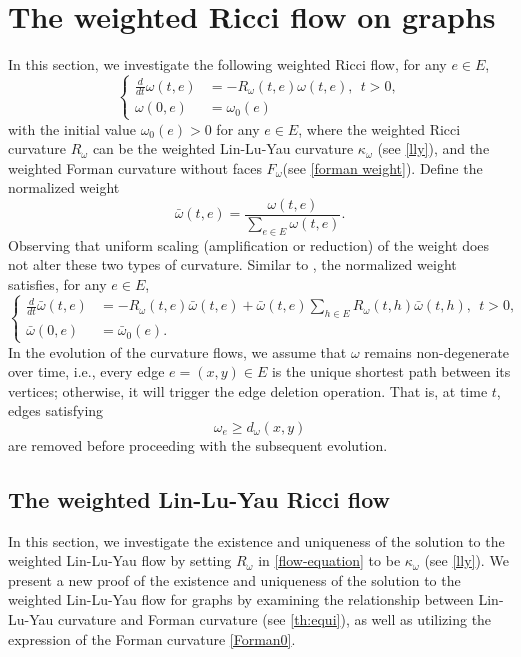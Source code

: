 \documentclass{article}
\begin{document}
\section{The weighted Ricci flow on graphs}
In this section, we investigate the following weighted Ricci flow, for any $e\in E$,
\begin{equation}\label{flow-equation}
\left\{\begin{aligned}
    \frac{d}{dt}\omega(t,e)&=-R_\omega(t,e)\omega(t,e),~~ t>0,\\
    \omega(0,e)&=\omega_0(e)
\end{aligned}
  \right.
\end{equation}
with the initial value $\omega_0(e)>0$ for any $e\in E$, where the weighted Ricci curvature $R_\omega$ can be the weighted Lin-Lu-Yau curvature $\kappa_{\omega}$ (see \eqref{lly}), and the weighted Forman curvature without faces $F_{\omega}$(see \eqref{forman weight}). Define the normalized weight
\[\bar{\omega}(t,e)=\frac{\omega(t,e)}{\sum_{e\in E}\omega(t,e)}.\]
Observing that uniform scaling (amplification or reduction) of the weight does not alter these two types of curvature. Similar to \cite{bailin}, the normalized weight satisfies, for any $e\in E$,
\begin{equation}\label{flow-equation-nor}
\left\{\begin{aligned}
    \frac{d}{dt}\bar{\omega}(t,e)&=-R_\omega(t,e)\bar{\omega}(t,e)+\bar{\omega}(t,e)\sum_{h\in E}R_\omega(t,h)\bar{\omega}(t,h),~~ t>0,\\
    \bar{\omega}(0,e)&=\bar{\omega}_0(e).
\end{aligned}
  \right.
\end{equation}
In the evolution of the curvature flows, we assume that $\omega$ remains non-degenerate over time,  i.e., every edge $e = (x,y)\in E$ is the unique shortest path between its vertices; otherwise, it will trigger the edge deletion operation. That is, at time $t$, edges satisfying 
\[\omega_e\geq d_\omega(x,y)\]
are removed before proceeding with the subsequent evolution.

\subsection{The weighted Lin-Lu-Yau Ricci flow}
In this section, we investigate the existence and uniqueness of the solution to the weighted Lin-Lu-Yau flow by setting $R_\omega$ in \eqref{flow-equation} to be $\kappa_{\omega}$ (see \eqref{lly}). We present a new proof of the existence and uniqueness of the solution to the weighted Lin-Lu-Yau flow for graphs by examining the relationship between Lin-Lu-Yau curvature and Forman curvature (see \eqref{th:equi}), as well as utilizing the expression of the Forman curvature \eqref{Forman0}.
\end{document}
